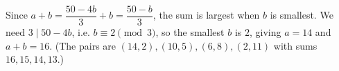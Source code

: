 Since $a+b=\dfrac{50-4b}{3}+b=\dfrac{50-b}{3}$, the sum is largest when $b$ is smallest. We need $3\mid50-4b$, i.e. $b\equiv2\pmod3$, so the smallest $b$ is $2$, giving $a=14$ and $a+b=\boxed{16}$. (The pairs are $(14,2),(10,5),(6,8),(2,11)$ with sums $16,15,14,13$.)
